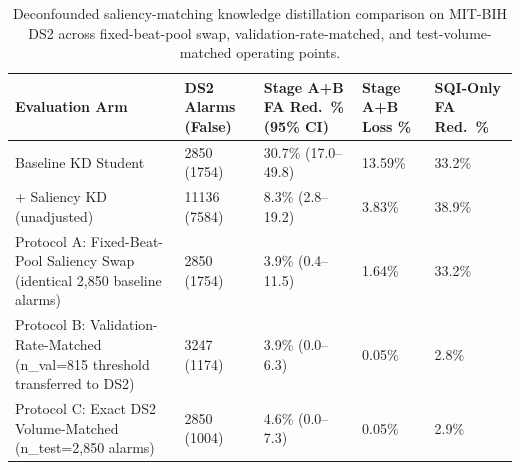 \begin{table}[t]
\centering
\caption{Deconfounded saliency-matching knowledge distillation comparison on MIT-BIH DS2 across fixed-beat-pool swap, validation-rate-matched, and test-volume-matched operating points.}
\label{tab:ablation_deconfounded}
\begin{tabular}{lllll}
\toprule
Evaluation Arm & DS2 Alarms (False) & Stage A+B FA Red.\ \% (95\% CI) & Stage A+B Loss \% & SQI-Only FA Red.\ \% \\
\midrule
Baseline KD Student & 2850 (1754) & 30.7\% (17.0--49.8) & 13.59\% & 33.2\% \\
+ Saliency KD (unadjusted) & 11136 (7584) & 8.3\% (2.8--19.2) & 3.83\% & 38.9\% \\
Protocol A: Fixed-Beat-Pool Saliency Swap (identical 2,850 baseline alarms) & 2850 (1754) & 3.9\% (0.4--11.5) & 1.64\% & 33.2\% \\
Protocol B: Validation-Rate-Matched (n_val=815 threshold transferred to DS2) & 3247 (1174) & 3.9\% (0.0--6.3) & 0.05\% & 2.8\% \\
Protocol C: Exact DS2 Volume-Matched (n_test=2,850 alarms) & 2850 (1004) & 4.6\% (0.0--7.3) & 0.05\% & 2.9\% \\
\bottomrule
\end{tabular}
\end{table}